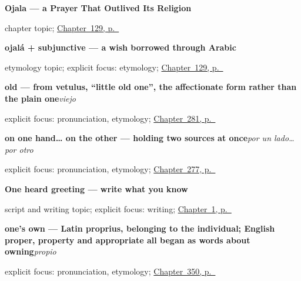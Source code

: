 \noindent\begin{minipage}[t]{\linewidth}
\raggedright
\textbf{Ojala --- a Prayer That Outlived Its Religion}\par
\footnotesize chapter topic; \hyperref[ch:spanish-ojala]{Chapter~129, p.~\pageref*{ch:spanish-ojala}}
\end{minipage}\par\smallskip

\noindent\begin{minipage}[t]{\linewidth}
\raggedright
\textbf{ojalá + subjunctive — a wish borrowed through Arabic}\par
\footnotesize etymology topic; explicit focus: etymology; \hyperref[ch:spanish-ojala]{Chapter~129, p.~\pageref*{ch:spanish-ojala}}
\end{minipage}\par\smallskip

\noindent\begin{minipage}[t]{\linewidth}
\raggedright
\textbf{old — from vetulus, \textquotedblleft{}little old one\textquotedblright{}, the affectionate form rather than the plain one}\enspace\emph{viejo}\par
\footnotesize explicit focus: pronunciation, etymology; \hyperref[ch:cuatro-adjetivos]{Chapter~281, p.~\pageref*{ch:cuatro-adjetivos}}
\end{minipage}\par\smallskip

\noindent\begin{minipage}[t]{\linewidth}
\raggedright
\textbf{on one hand… on the other — holding two sources at once}\enspace\emph{por un lado… por otro}\par
\footnotesize explicit focus: pronunciation, etymology; \hyperref[ch:fuentes]{Chapter~277, p.~\pageref*{ch:fuentes}}
\end{minipage}\par\smallskip

\noindent\begin{minipage}[t]{\linewidth}
\raggedright
\textbf{One heard greeting — write what you know}\par
\footnotesize script and writing topic; explicit focus: writing; \hyperref[ch:first-words]{Chapter~1, p.~\pageref*{ch:first-words}}
\end{minipage}\par\smallskip

\noindent\begin{minipage}[t]{\linewidth}
\raggedright
\textbf{one's own — Latin proprius, belonging to the individual; English proper, property and appropriate all began as words about owning}\enspace\emph{propio}\par
\footnotesize explicit focus: pronunciation, etymology; \hyperref[ch:propio-y-ajeno]{Chapter~350, p.~\pageref*{ch:propio-y-ajeno}}
\end{minipage}\par\smallskip

